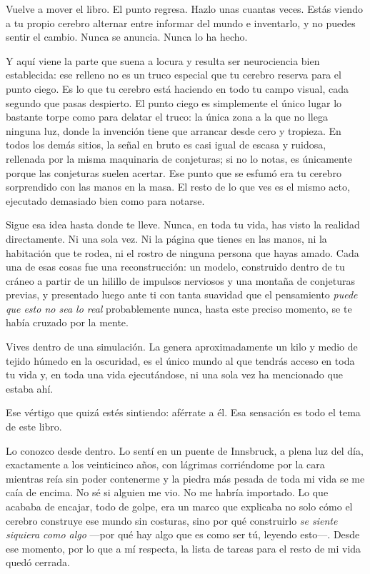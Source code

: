 \documentclass[11pt, twoside, openright]{book}
\begin{document}
Vuelve a mover el libro. El punto regresa. Hazlo unas cuantas veces. Estás viendo a tu propio cerebro alternar entre informar del mundo e inventarlo, y no puedes sentir el cambio. Nunca se anuncia. Nunca lo ha hecho.

Y aquí viene la parte que suena a locura y resulta ser neurociencia bien establecida: ese relleno no es un truco especial que tu cerebro reserva para el punto ciego. Es lo que tu cerebro está haciendo en todo tu campo visual, cada segundo que pasas despierto. El punto ciego es simplemente el único lugar lo bastante torpe como para delatar el truco: la única zona a la que no llega ninguna luz, donde la invención tiene que arrancar desde cero y tropieza. En todos los demás sitios, la señal en bruto es casi igual de escasa y ruidosa, rellenada por la misma maquinaria de conjeturas; si no lo notas, es únicamente porque las conjeturas suelen acertar. Ese punto que se esfumó era tu cerebro sorprendido con las manos en la masa. El resto de lo que ves es el mismo acto, ejecutado demasiado bien como para notarse.

Sigue esa idea hasta donde te lleve. Nunca, en toda tu vida, has visto la realidad directamente. Ni una sola vez. Ni la página que tienes en las manos, ni la habitación que te rodea, ni el rostro de ninguna persona que hayas amado. Cada una de esas cosas fue una reconstrucción: un modelo, construido dentro de tu cráneo a partir de un hilillo de impulsos nerviosos y una montaña de conjeturas previas, y presentado luego ante ti con tanta suavidad que el pensamiento \textit{puede que esto no sea lo real} probablemente nunca, hasta este preciso momento, se te había cruzado por la mente.

Vives dentro de una simulación. La genera aproximadamente un kilo y medio de tejido húmedo en la oscuridad, es el único mundo al que tendrás acceso en toda tu vida y, en toda una vida ejecutándose, ni una sola vez ha mencionado que estaba ahí.

Ese vértigo que quizá estés sintiendo: aférrate a él. Esa sensación es todo el tema de este libro.

Lo conozco desde dentro. Lo sentí en un puente de Innsbruck, a plena luz del día, exactamente a los veinticinco años, con lágrimas corriéndome por la cara mientras reía sin poder contenerme y la piedra más pesada de toda mi vida se me caía de encima. No sé si alguien me vio. No me habría importado. Lo que acababa de encajar, todo de golpe, era un marco que explicaba no solo cómo el cerebro construye ese mundo sin costuras, sino por qué construirlo \textit{se siente siquiera como algo} ---por qué hay algo que es como ser tú, leyendo esto---. Desde ese momento, por lo que a mí respecta, la lista de tareas para el resto de mi vida quedó cerrada.
\end{document}
